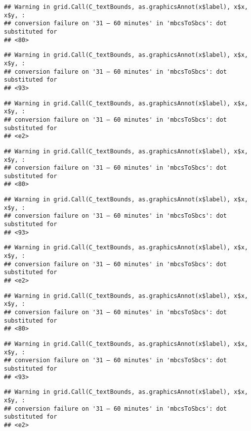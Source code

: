 \documentclass[
]{article}
\begin{document}
\begin{verbatim}
## Warning in grid.Call(C_textBounds, as.graphicsAnnot(x$label), x$x, x$y, :
## conversion failure on '31 – 60 minutes' in 'mbcsToSbcs': dot substituted for
## <80>
\end{verbatim}

\begin{verbatim}
## Warning in grid.Call(C_textBounds, as.graphicsAnnot(x$label), x$x, x$y, :
## conversion failure on '31 – 60 minutes' in 'mbcsToSbcs': dot substituted for
## <93>
\end{verbatim}

\begin{verbatim}
## Warning in grid.Call(C_textBounds, as.graphicsAnnot(x$label), x$x, x$y, :
## conversion failure on '31 – 60 minutes' in 'mbcsToSbcs': dot substituted for
## <e2>
\end{verbatim}

\begin{verbatim}
## Warning in grid.Call(C_textBounds, as.graphicsAnnot(x$label), x$x, x$y, :
## conversion failure on '31 – 60 minutes' in 'mbcsToSbcs': dot substituted for
## <80>
\end{verbatim}

\begin{verbatim}
## Warning in grid.Call(C_textBounds, as.graphicsAnnot(x$label), x$x, x$y, :
## conversion failure on '31 – 60 minutes' in 'mbcsToSbcs': dot substituted for
## <93>
\end{verbatim}

\begin{verbatim}
## Warning in grid.Call(C_textBounds, as.graphicsAnnot(x$label), x$x, x$y, :
## conversion failure on '31 – 60 minutes' in 'mbcsToSbcs': dot substituted for
## <e2>
\end{verbatim}

\begin{verbatim}
## Warning in grid.Call(C_textBounds, as.graphicsAnnot(x$label), x$x, x$y, :
## conversion failure on '31 – 60 minutes' in 'mbcsToSbcs': dot substituted for
## <80>
\end{verbatim}

\begin{verbatim}
## Warning in grid.Call(C_textBounds, as.graphicsAnnot(x$label), x$x, x$y, :
## conversion failure on '31 – 60 minutes' in 'mbcsToSbcs': dot substituted for
## <93>
\end{verbatim}

\begin{verbatim}
## Warning in grid.Call(C_textBounds, as.graphicsAnnot(x$label), x$x, x$y, :
## conversion failure on '31 – 60 minutes' in 'mbcsToSbcs': dot substituted for
## <e2>
\end{verbatim}
\end{document}

